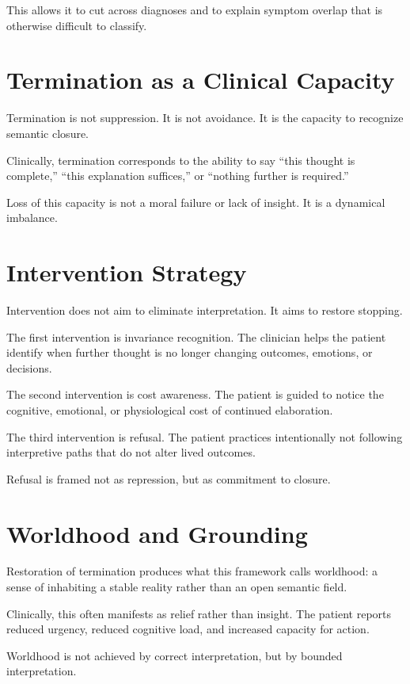 \documentclass[12pt]{article}
\begin{document}
This allows it to cut across diagnoses and to explain symptom overlap that is otherwise difficult to classify.

\section{Termination as a Clinical Capacity}

Termination is not suppression. It is not avoidance. It is the capacity to recognize semantic closure.

Clinically, termination corresponds to the ability to say “this thought is complete,” “this explanation suffices,” or “nothing further is required.”

Loss of this capacity is not a moral failure or lack of insight. It is a dynamical imbalance.

\section{Intervention Strategy}

Intervention does not aim to eliminate interpretation. It aims to restore stopping.

The first intervention is invariance recognition. The clinician helps the patient identify when further thought is no longer changing outcomes, emotions, or decisions.

The second intervention is cost awareness. The patient is guided to notice the cognitive, emotional, or physiological cost of continued elaboration.

The third intervention is refusal. The patient practices intentionally not following interpretive paths that do not alter lived outcomes.

Refusal is framed not as repression, but as commitment to closure.

\section{Worldhood and Grounding}

Restoration of termination produces what this framework calls worldhood: a sense of inhabiting a stable reality rather than an open semantic field.

Clinically, this often manifests as relief rather than insight. The patient reports reduced urgency, reduced cognitive load, and increased capacity for action.

Worldhood is not achieved by correct interpretation, but by bounded interpretation.
\end{document}

